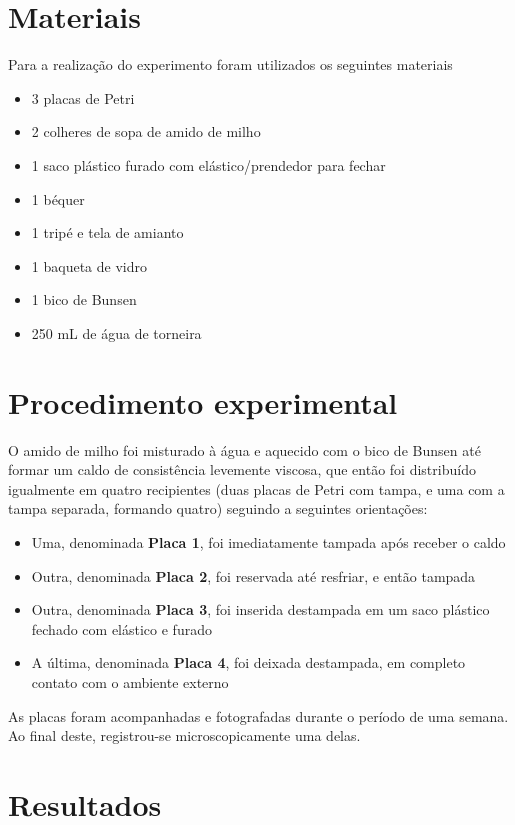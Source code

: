 \documentclass[12pt, titlepage]{article}
\begin{document}
\section{Materiais}
Para a realização do experimento foram utilizados os seguintes materiais
\begin{itemize}
	\item 3 placas de Petri
	\item 2 colheres de sopa de amido de milho
	\item 1 saco plástico furado com elástico/prendedor para fechar
	\item 1 béquer
	\item 1 tripé e tela de amianto
	\item 1 baqueta de vidro
	\item 1 bico de Bunsen
	\item 250 mL de água de torneira
\end{itemize}

\section{Procedimento experimental}
O amido de milho foi misturado à água e aquecido com o bico de Bunsen até formar um caldo de consistência levemente viscosa, que então foi distribuído igualmente em quatro recipientes (duas placas de Petri com tampa, e uma com a tampa separada, formando quatro) seguindo a seguintes orientações:
\begin{itemize}
	\item Uma, denominada \textbf{Placa 1}, foi imediatamente tampada após receber o caldo
	\item Outra, denominada \textbf{Placa 2}, foi reservada até resfriar, e então tampada
	\item Outra, denominada \textbf{Placa 3}, foi inserida destampada em um saco plástico fechado com elástico e furado
	\item A última, denominada \textbf{Placa 4}, foi deixada destampada, em completo contato com o ambiente externo
\end{itemize}
As placas foram acompanhadas e fotografadas durante o período de uma semana. Ao final deste, registrou-se microscopicamente uma delas.

\section{Resultados}
\end{document}
